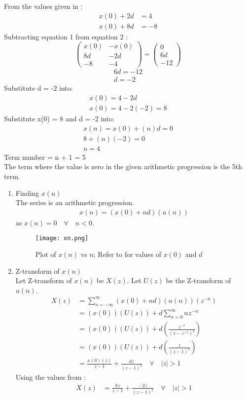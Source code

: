 \documentclass[journal,12pt,twocolumn]{IEEEtran}
\theoremstyle{remark}
\begin{document}
From the values given in :
\begin{align}
    x(0) + 2d &= 4\\
    x(0) + 8d &= -8
\end{align}
Subtracting equation 1 from equation 2 :
\begin{equation}
\left(
\begin{array}{rr}
x(0) & -x(0) \\
8d & -2d \\
-8 & -4
\end{array}
\right)
=
\left(
\begin{array}{r}
0 \\
6d \\
-12
\end{array}
\right)
\end{equation}
\begin{align}
6d = -12 \\
d = -2 
\end{align}
Substitute d = -2 into:
\begin{align}
x(0) = 4 - 2d\\
x(0) = 4 - 2(-2) = 8
\end{align}
Substitute x(0) = 8 and d = -2 into:
\begin{align}
x(n) = x(0) + (n)d = 0 \\
8 + (n)(-2) = 0 \\
n = 4
\end{align}
Term number = n + 1 = 5 \\
The term where the value is zero in the given arithmetic progression is the 5th term.\\
\begin{enumerate}
\item Finding $x(n)$ \\
The series is an arithmetic progression.
\begin{align}
x(n) = (x(0) + nd)(u(n))
\end{align}
as $x(n) = 0 \quad \forall \quad n < 0$.
\begin{figure}[h!]
    \centering
    \texttt{[image: xn.png]}
    \caption{Plot of $x(n)$ vs $n$; Refer to  for values of $x(0)$ and $d$}
    \label{fig:1}
\end{figure}
\item Z-transform of $x(n)$ \\
Let Z-transform of $x(n)$ be $X(z)$. Let $U(z)$ be the Z-transform of $u(n)$.
\begin{align}
X(z) &= \sum_{n = -\infty}^{\infty} (x(0) + nd)(u(n))(z^{-n}) \\
&= (x(0))(U(z)) + d\sum_{n = 0}^{\infty}nz^{-n} \\
&= (x(0))(U(z)) + d(\frac{z^{-1}}{(1 - z^{-1})^2}) \\
&= (x(0))(U(z)) + d(\frac{z}{(z - 1)^2}) \\
&= \frac{x(0)(z)}{z - 1} + \frac{dz}{(z - 1)^2} \quad \forall \quad |z| > 1
\end{align}
Using the values from :
\begin{align}
X(z) &= \frac{8z}{z - 1} + \frac{-2z}{(z - 1)^2} \quad \forall \quad |z| > 1
\end{align}
\end{enumerate}
\end{document}
